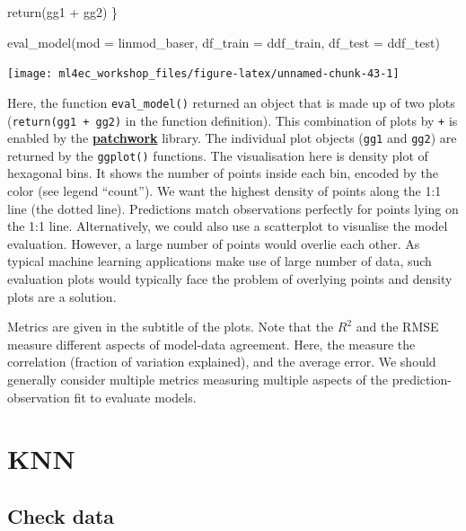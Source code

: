 \documentclass[
]{book}
\newenvironment{Shaded}{\begin{snugshade}}{\end{snugshade}}
\newcommand{\AttributeTok}[1]{\textcolor[rgb]{0.77,0.63,0.00}{#1}}
\newcommand{\FunctionTok}[1]{\textcolor[rgb]{0.00,0.00,0.00}{#1}}
\newcommand{\NormalTok}[1]{#1}
\newcommand{\SpecialCharTok}[1]{\textcolor[rgb]{0.00,0.00,0.00}{#1}}
\begin{document}
\begin{Shaded}
\begin{Highlighting}[]
  \FunctionTok{return}\NormalTok{(gg1 }\SpecialCharTok{+}\NormalTok{ gg2)}
\NormalTok{\}}

\FunctionTok{eval\_model}\NormalTok{(}\AttributeTok{mod =}\NormalTok{ linmod\_baser, }\AttributeTok{df\_train =}\NormalTok{ ddf\_train, }\AttributeTok{df\_test =}\NormalTok{ ddf\_test)}
\end{Highlighting}
\end{Shaded}

\begin{center}\texttt{[image: ml4ec\_workshop\_files/figure-latex/unnamed-chunk-43-1]} \end{center}

Here, the function \texttt{eval\_model()} returned an object that is made up of two plots (\texttt{return(gg1\ +\ gg2)} in the function definition). This combination of plots by \texttt{+} is enabled by the \href{https://patchwork.data-imaginist.com/}{\textbf{patchwork}} library. The individual plot objects (\texttt{gg1} and \texttt{gg2}) are returned by the \texttt{ggplot()} functions. The visualisation here is density plot of hexagonal bins. It shows the number of points inside each bin, encoded by the color (see legend ``count''). We want the highest density of points along the 1:1 line (the dotted line). Predictions match observations perfectly for points lying on the 1:1 line. Alternatively, we could also use a scatterplot to visualise the model evaluation. However, a large number of points would overlie each other. As typical machine learning applications make use of large number of data, such evaluation plots would typically face the problem of overlying points and density plots are a solution.

Metrics are given in the subtitle of the plots. Note that the \(R^2\) and the RMSE measure different aspects of model-data agreement. Here, the measure the correlation (fraction of variation explained), and the average error. We should generally consider multiple metrics measuring multiple aspects of the prediction-observation fit to evaluate models.

\hypertarget{knn-1}{%
\section{KNN}\label{knn-1}}

\hypertarget{check-data-1}{%
\subsection{Check data}\label{check-data-1}}
\end{document}
